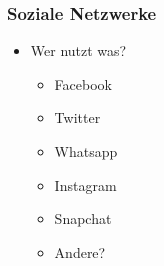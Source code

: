 \begin{frame}
  \frametitle{Soziale Netzwerke}
  \begin{itemize}
    \item Wer nutzt was?
      \begin{itemize}
        \item<2-> Facebook
        \item<3-> Twitter
        \item<4-> Whatsapp
        \item<5-> Instagram
        \item<6-> Snapchat
        \item<7-> Andere?
      \end{itemize}
  \end{itemize}
\end{frame}

